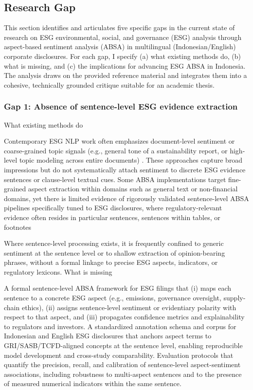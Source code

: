 \subsection{Research Gap}

This section identifies and articulates five specific gaps in the current state of research on ESG environmental, social, and governance (ESG) analysis through aspect-based sentiment analysis (ABSA) in multilingual (Indonesian/English) corporate disclosures. For each gap, I specify (a) what existing methods do, (b) what is missing, and (c) the implications for advancing ESG ABSA in Indonesia. The analysis draws on the provided reference material and integrates them into a cohesive, technically grounded critique suitable for an academic thesis.

\subsubsection{Gap 1: Absence of sentence-level ESG evidence extraction}
What existing methods do

Contemporary ESG NLP work often emphasizes document-level sentiment or coarse-grained topic signals (e.g., general tone of a sustainability report, or high-level topic modeling across entire documents) \cite{10.3390/su14159165,10.3390/su15054134,10.69593/ajbais.v4i04.130,10.1111/eufm.12509}. These approaches capture broad impressions but do not systematically attach sentiment to discrete ESG evidence sentences or clause-level textual cues.
Some ABSA implementations target fine-grained aspect extraction within domains such as general text or non-financial domains, yet there is limited evidence of rigorously validated sentence-level ABSA pipelines specifically tuned to ESG disclosures, where regulatory-relevant evidence often resides in particular sentences, sentences within tables, or footnotes \cite{10.1002/csr.70089,10.3390/math12193119,10.2139/ssrn.3738629,10.1111/eufm.12509}

Where sentence-level processing exists, it is frequently confined to generic sentiment at the sentence level or to shallow extraction of opinion-bearing phrases, without a formal linkage to precise ESG aspects, indicators, or regulatory lexicons.
What is missing

A formal sentence-level ABSA framework for ESG filings that (i) maps each sentence to a concrete ESG aspect (e.g., emissions, governance oversight, supply-chain ethics), (ii) assigns sentence-level sentiment or evidentiary polarity with respect to that aspect, and (iii) propagates confidence metrics and explainability to regulators and investors.
A standardized annotation schema and corpus for Indonesian and English ESG disclosures that anchors aspect terms to GRI/SASB/TCFD-aligned concepts at the sentence level, enabling reproducible model development and cross-study comparability.
Evaluation protocols that quantify the precision, recall, and calibration of sentence-level aspect-sentiment associations, including robustness to multi-aspect sentences and to the presence of measured numerical indicators within the same sentence.

